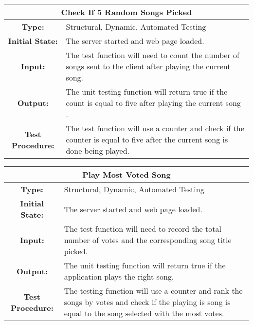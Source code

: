 \documentclass[12pt, titlepage]{article}
\begin{document}
\begin{center}
\begin{table}[H]
\begin{tabularx}{\textwidth}{| c X |}
\hline
\multicolumn{2}{|c|}{\textbf{Check If 5 Random Songs Picked}}\\
\hline
\textbf{Type: } & Structural, Dynamic, Automated Testing\\

\textbf{Initial State: } & The server started and web page loaded.\\

\textbf{Input: } & The test function will need to count the number of songs sent to the client after playing the current song.\\

\textbf{Output: } & The unit testing function will return true if the count is equal to five after playing the current song .\\

\textbf{Test Procedure: } &The test function will use a counter and check if the counter is equal to five after the current song is done being played. \\
\hline
\end{tabularx}
\end{table}
\end{center}

\begin{center}
\begin{table}[H]
\begin{tabularx}{\textwidth}{| c X |}
\hline
\multicolumn{2}{|c|}{\textbf{Play Most Voted Song}}\\
\hline
\textbf{Type: } & Structural, Dynamic, Automated Testing\\

\textbf{Initial State: } & The server started and web page loaded.\\

\textbf{Input: } & The test function will need to record the total number of votes and the corresponding song title picked.\\

\textbf{Output: } & The unit testing function will return true if the application plays the right song.\\

\textbf{Test Procedure: } &The testing function will use a counter and rank the songs by votes and check if the playing is song is equal to the song selected with the most votes. \\
\hline
\end{tabularx}
\end{table}
\end{center}
\end{document}
